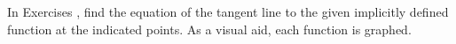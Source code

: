 {\noindent In Exercises}
{, find the equation of the tangent line to the given implicitly defined function at the indicated points. As a visual aid, each function is graphed.
}
